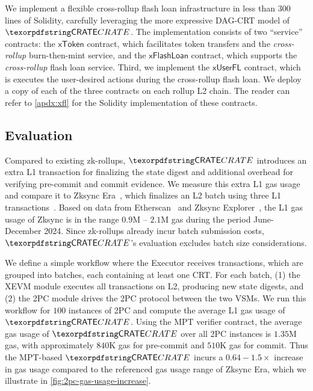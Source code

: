 \newcommand{\token}{\mathsf{xToken}}
\newcommand{\flpool}{\mathsf{xFlashLoan}}
\newcommand{\userfl}{\mathsf{xUserFL}}

We implement a flexible cross-rollup flash loan infrastructure in less than 300 lines of Solidity, carefully leveraging the more expressive DAG-CRT model of $\pname$. The implementation consists of two ``service'' contracts: the $\token$ contract, which facilitates token transfers and the \emph{cross-rollup} burn-then-mint service, and the $\flpool$ contract, which supports the \emph{cross-rollup} flash loan service.
Third, we implement the $\userfl$ contract, which is executes the user-desired actions during the cross-rollup flash loan. We deploy a copy of each of the three contracts on each rollup L2 chain.
The reader can refer to \cref{apdx:xfl} for the Solidity implementation of these contracts.



\subsection{Evaluation}

\newcommand{\batchsize}{\mathsf{batchSize}}
\newcommand{\numbatches}{\mathsf{numBatches}}


Compared to existing zk-rollups, $\pname$ introduces an extra L1 transaction for finalizing the state digest and additional overhead for verifying pre-commit and commit evidence. We measure this extra L1 gas usage and compare it to Zksync Era~\cite{zksync-era}, which finalizes an L2 batch using three L1 transactions~\cite{quarkslab-zksync-workflow}. Based on data from Etherscan~\cite{etherscan} and Zksync Explorer~\cite{zksync-explorer}, the L1 gas usage of Zksync is in the range $0.9$M -- $2.1$M gas during the period June-December 2024. Since zk-rollups already incur batch submission costs, $\pname$’s evaluation excludes batch size considerations.


We define a simple workflow where the Executor receives transactions, which are grouped into batches, each containing at least one CRT. For each batch, (1) the XEVM module executes all transactions on L2, producing new state digests, and (2) the 2PC module drives the 2PC protocol between the two VSMs. We run this workflow for $100$ instances of 2PC and compute the average L1 gas usage of $\pname$. Using the MPT verifier contract, the average gas usage of $\pname$ over all 2PC instances is $1.35$M gas, with approximately $840$K gas for pre-commit and $510$K gas for commit. Thus the MPT-based $\pname$ incurs a $\mathbf{0.64-1.5}\times$ increase in gas usage compared to the referenced gas usage range of Zksync Era, which we illustrate in \cref{fig:2pc-gas-usage-increase}.



